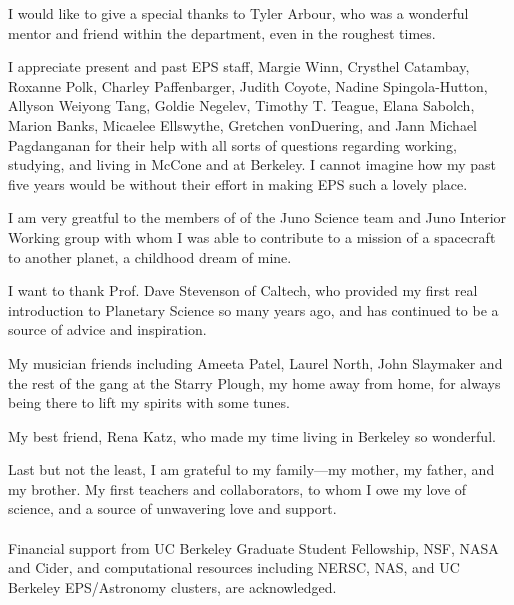 \documentclass[phd,12pt]{ucbthesis}
\begin{document}
\begin{frontmatter}
\begin{acknowledgements}
I would like to give a special thanks to Tyler Arbour, who was a wonderful mentor and
friend within the department, even in the roughest times.

I appreciate present and past EPS staff, Margie Winn, Crysthel Catambay, Roxanne
Polk, Charley Paffenbarger, Judith Coyote, Nadine Spingola-Hutton, Allyson Weiyong
Tang, Goldie Negelev, Timothy T. Teague, Elana Sabolch, Marion Banks, Micaelee
Ellswythe, Gretchen vonDuering, and Jann Michael Pagdanganan for their help with all
sorts of questions regarding working, studying, and living in McCone and at Berkeley.
I cannot imagine how my past five years would be without their effort in making EPS
such a lovely place.

I am very greatful to the members of of the Juno Science team and Juno Interior
Working group with whom I was able to contribute to a mission of a spacecraft to
another planet, a childhood dream of mine.

I want to thank Prof. Dave Stevenson of Caltech, who provided my first real introduction
to Planetary Science so many years ago, and has continued to be a source of advice
and inspiration.

My musician friends including Ameeta Patel, Laurel North, John
Slaymaker and the rest of the gang at the Starry Plough, my home away from home, for
always being there to lift my spirits with some tunes.

My best friend, Rena Katz, who made my time living in Berkeley so wonderful.

Last but not the least, I am grateful to my family---my mother, my father, and my
brother. My first teachers and collaborators, to whom I owe my love of science, and a
source of unwavering love and support. \\\\

Financial support from UC Berkeley Graduate Student Fellowship, NSF, NASA and Cider,
and computational resources including  NERSC, NAS, and UC Berkeley EPS/Astronomy
clusters, are acknowledged.

\end{acknowledgements}

\end{frontmatter}

\pagestyle{headings}














%
%
%


\end{document}
